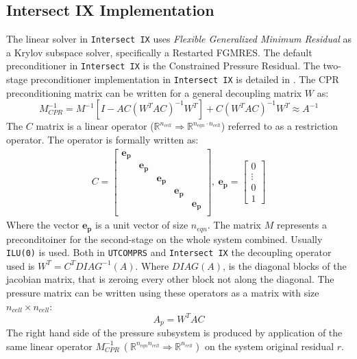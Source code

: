 \subsection{Intersect IX Implementation}
The linear solver in \texttt{Intersect IX} uses \textit{Flexible Generalized Minimum Residual} as a Krylov subspace solver, specifically a Restarted FGMRES.  
The default preconditioner in \texttt{Intersect IX} is the Constrained Pressure Residual. The two-stage preconditioner implementation in \texttt{Intersect IX}
is detailed in \cite{ix-cpr,ix-tech}. The CPR preconditioning matrix can be written for a general decoupling matrix $W$ as:
\begin{equation}
	M_{CPR}^{-1} = M^{-1}[I - AC(W^{T}AC)^{-1}W^{T}] + C(W^{T}AC)^{-1}W^{T}\approx A^{-1}
\end{equation}
The $C$ matrix is a linear operator ($\mathbb{R}^{n_{cell}}\Rightarrow\mathbb{R}^{n_{eqn}\cdot n_{cell}}$) referred to as a restriction operator.
The operator is formally written as:
\begin{align*}
	C = \begin{bmatrix}
		\mathbf{e_{p}} & & & & \\
		      & \mathbf{e_{p}} & & &\\ 
		      &  & \mathbf{e_{p}}& &\\ 
		      &  & & \mathbf{e_{p}}&\\ 
		      &  & & &\mathbf{e_{p}}\\ 
	\end{bmatrix}, \ 
	\mathbf{e_{p}} = \begin{bmatrix}
		0\\
		\vdots\\
		0\\
		1
	\end{bmatrix}
\end{align*}
Where the vector $\mathbf{e_{p}}$ is a unit vector of size $n_{eqn}$.
The matrix $M$ represents a preconditoiner for the second-stage on the whole system combined. Usually \texttt{ILU(0)} is used.
Both in \texttt{UTCOMPRS} and \texttt{Intersect IX} the decoupling operator used is $W^{T} = C^{T}DIAG^{-1}(A)$. Where $DIAG(A)$,
is the diagonal blocks of the jacobian matrix, that is zeroing every other block not along the diagonal. The pressure matrix can be written
using these operators as a matrix with size $n_{cell}\times n_{cell}$:
\begin{equation}
	A_{p} = W^{T}AC
\end{equation}
The right hand side of the pressure subsystem is produced by application of the same linear operator $M_{CPR}^{-1} \ (\mathbb{R}^{n_{eqn}n_{cell}}\Rightarrow\mathbb{R}^{n_{cell}})$ 
on the system original residual $r$.

